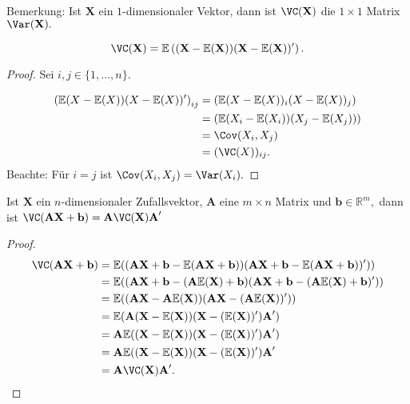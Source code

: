\documentclass{tstextbook}
\begin{document}
\begin{remark}
	Bemerkung: Ist $\textbf{X}$ ein $1$-dimensionaler Vektor, dann ist $\VC(\textbf{X})$ die $1\times1$ Matrix $\Var(\textbf{X}).$
\end{remark}

\begin{theorem}
    \[ \VC(\textbf{X})=\mathbb{E}\left((\textbf{X}-\mathbb{E}(\textbf{X}))(\textbf{X}-\mathbb{E}(\textbf{X}))^\prime \right).\]
\end{theorem}

\begin{proof}
    Sei $i,j\in\lbrace1,\ldots,n\rbrace.$

\[
\begin{aligned}
\left(\mathbb{E}(X-\mathbb{E}(X))(X-\mathbb{E}(X))^\prime\right)_{ij} & = \left(\mathbb{E}(X-\mathbb{E}(X))_i(X-\mathbb{E}(X))_j\right) \\
 & = \left(\mathbb{E}(X_i-\mathbb{E}(X_i))(X_j-\mathbb{E}(X_j))\right) \\
 &= \Cov(X_i,X_j) \\
 &= (\VC(X))_{ij}. 
\end{aligned}
\]
Beachte: Für $i=j$ ist $\Cov(X_i,X_j)=\Var(X_i). $
    
\end{proof}

\begin{theorem}
    Ist $\textbf{X}$ ein $n$-dimensionaler Zufallsvektor, $\textbf{A}$ eine $m\times n$ Matrix und $\textbf{b}\in\mathbb{R}^m,$ dann ist $\VC(\textbf{A}\textbf{X}+\textbf{b})=\textbf{A}\VC(\textbf{X})\textbf{A}^\prime$
\end{theorem}
   
        
\begin{proof}
\begin{align*}
    	\VC(\textbf{A}\textbf{X}+\textbf{b}) & = \mathbb{E}((\textbf{A}\textbf{X}+\textbf{b}-\mathbb{E}(\textbf{A}\textbf{X}+\textbf{b}))(\textbf{A}\textbf{X}+\textbf{b}-\mathbb{E}(\textbf{A}\textbf{X}+\textbf{b}))^\prime)) \\
    	& = \mathbb{E}((\textbf{A}\textbf{X}+\textbf{b}-(\textbf{A}\mathbb{E}(\textbf{X})+\textbf{b})(\textbf{A}\textbf{X}+\textbf{b}-(\textbf{A}\mathbb{E}(\textbf{X})+\textbf{b})^\prime)) \\
    	& = \mathbb{E}((\textbf{A}\textbf{X}-\textbf{A}\mathbb{E}(\textbf{X}))(\textbf{A}\textbf{X}-(\textbf{A}\mathbb{E}(\textbf{X}))^\prime)) \\
    	& = \mathbb{E}(\textbf{A}(\textbf{X}-\mathbb{E}(\textbf{X}))(\textbf{X}-(\mathbb{E}(\textbf{X}))^\prime)\textbf{A}^\prime) \\
    	& = \textbf{A}\mathbb{E}((\textbf{X}-\mathbb{E}(\textbf{X}))(\textbf{X}-(\mathbb{E}(\textbf{X}))^\prime)\textbf{A}^\prime) \\
    	& = \textbf{A}\mathbb{E}((\textbf{X}-\mathbb{E}(\textbf{X}))(\textbf{X}-(\mathbb{E}(\textbf{X}))^\prime)\textbf{A}^\prime \\
    	& = \textbf{A}\VC(\textbf{X})\textbf{A}^\prime.
\end{align*} 
\end{proof}
\end{document}
